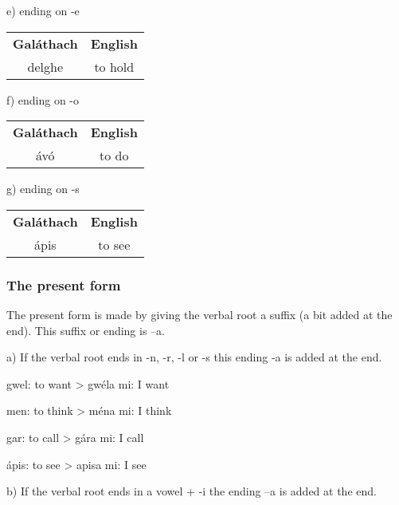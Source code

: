 e) ending on -e

\begin{table}[H]
\centering
\begin{tabular}{cc}
  \toprule
  \textbf{Gal\'{a}thach} & \textbf{English}\\
  \cmidrule(lr){1-1}\cmidrule(lr){2-2}
  delghe & to hold\\
  \bottomrule
\end{tabular}
\label{examples_ending_a}
\end{table}

f) ending on -o

\begin{table}[H]
\centering
\begin{tabular}{cc}
  \toprule
  \textbf{Gal\'{a}thach} & \textbf{English}\\
  \cmidrule(lr){1-1}\cmidrule(lr){2-2}
  \'{a}v\'{o} & to do\\
  \bottomrule
\end{tabular}
\label{examples_ending_o}
\end{table}

g) ending on -s

\begin{table}[H]
\centering
\begin{tabular}{cc}
  \toprule
  \textbf{Gal\'{a}thach} & \textbf{English}\\
  \cmidrule(lr){1-1}\cmidrule(lr){2-2}
  \'{a}pis & to see\\
  \bottomrule
\end{tabular}
\label{examples_ending_s}
\end{table}


\subsubsection{The present form}

The present form is made by giving the verbal root a suffix (a bit added at the end). This suffix or ending is –a. 

a) If the verbal root ends in -n, -r, -l or -s this ending -a is added at the end.

gwel: to want
> gw\'{e}la mi: I want

men: to think
> m\'{e}na mi: I think

gar: to call
> g\'{a}ra mi: I call

\'{a}pis: to see
> apisa mi: I see

b) If the verbal root ends in a vowel + -i the ending –a is added at the end.

